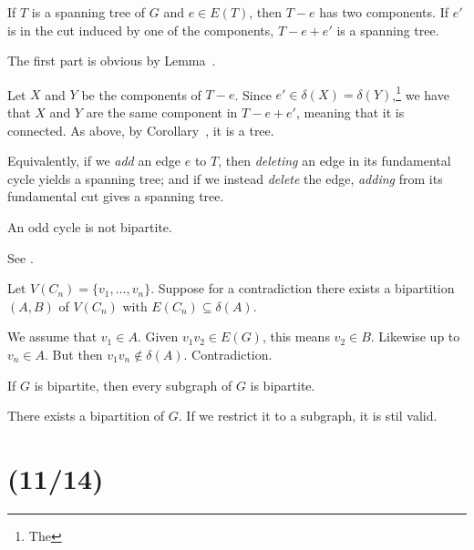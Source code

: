 \begin{theorem}[5.2.4]
  If $T$ is a spanning tree of $G$ and $e \in E(T)$,
  then $T-e$ has two components.
  If $e'$ is in the cut induced by one of the components,
  $T-e+e'$ is a spanning tree.
\end{theorem}
\begin{prf}
  The first part is obvious by Lemma~.

  Let $X$ and $Y$ be the components of $T-e$.
  Since $e' \in \delta(X) = \delta(Y)$,\footnote{The }
  we have that $X$ and $Y$ are the same component
  in $T-e+e'$, meaning that it is connected.
  As above, by Corollary~, it is a tree.
\end{prf}

Equivalently, if we \emph{add} an edge $e$ to $T$,
then \emph{deleting} an edge in its fundamental cycle yields a spanning tree;
and if we instead \emph{delete} the edge,
\emph{adding} from its fundamental cut gives a spanning tree.

\begin{lemma}[5.3.1]\label{lem:oddbi}
  An odd cycle is not bipartite.
\end{lemma}
\begin{prf}
  See .

  Let $V(C_n) = \{v_1,\dotsc,v_n\}$.
  Suppose for a contradiction there exists a bipartition
  $(A,B)$ of $V(C_n)$ with $E(C_n) \subseteq \delta(A)$.

  We assume \Wlog that $v_1 \in A$.
  Given $v_1v_2 \in E(G)$, this means $v_2 \in B$.
  Likewise up to $v_n \in A$.
  But then $v_1v_n \not\in \delta(A)$.
  Contradiction.
\end{prf}

\begin{prop}
  If $G$ is bipartite, then every subgraph of $G$ is bipartite.
\end{prop}
\begin{prf}
  There exists a bipartition of $G$.
  If we restrict it to a subgraph, it is stil valid.
\end{prf}

\section{(11/14)}

